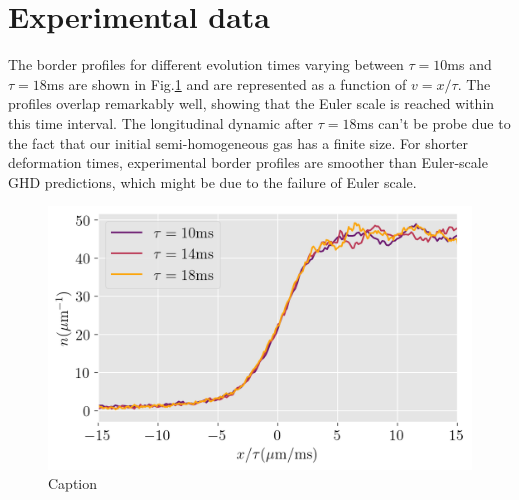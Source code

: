 \documentclass[submission, Phys]{SciPost}
\begin{document}


\section{Experimental data}\label{sec.ed}

The border profiles for different evolution times varying between $\tau = 10$ms and $\tau = 18$ms are shown in Fig.\ref{fig:euler} and are represented as a function of $v=x /\tau$. The profiles overlap remarkably well, showing that the Euler scale is reached within this time interval. %
The longitudinal dynamic after $\tau = 18$ms can't be probe due to the fact that our initial semi-homogeneous gas has a finite size. For shorter deformation times, experimental  border profiles  
are smoother than Euler-scale GHD predictions, which might be due to 
the failure of Euler scale.  %

\begin{figure}[!htb]
    \centering
    \includegraphics[width=0.7\linewidth]{Figures/Hydroscaling_DWD.png}
    \caption{Caption}
    \label{fig:euler}
\end{figure}
\end{document}
